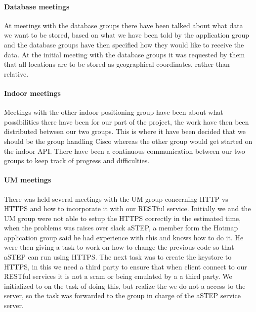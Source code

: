 \paragraph{Database meetings}
At meetings with the database groups there have been talked about what data we want to be stored, based on what we have been told by the application group and the database groups have then specified how they would like to receive the data. At the initial meeting with the database groups it was requested by them that all locations are to be stored as geographical coordinates, rather than relative.%

\paragraph{Indoor meetings}
Meetings with the other indoor positioning group have been about what possibilities there have been for our part of the project, the work have then been distributed between our two groups. This is where it have been decided that we should be the group handling Cisco whereas the other group would get started on the indoor API. There have been a continuous communication between our two groups to keep track of progress and difficulties. 

\paragraph{UM meetings}
There was held several meetings with the UM group concerning HTTP vs HTTPS and how to incorporate it with our RESTful service. Initially we and the UM group were not able to setup the HTTPS correctly in the estimated time, when the problems was raises over slack aSTEP, a member form the Hotmap application group said he had experience with this and knows how to do it. He were then giving a task to work on how to change the previous code so that aSTEP can run using HTTPS. The next task was to create the keystore to HTTPS, in this we need a third party to ensure that when client connect to our RESTful services it is not a scam or being emulated by a a third party. We initialized to on the task of doing this, but realize the we do not a access to the server, so the task was forwarded to the group in charge of the aSTEP service server. 
